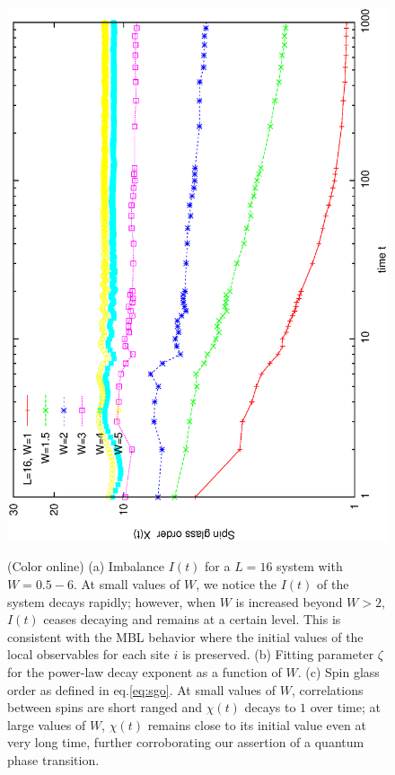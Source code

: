 \documentclass[prl,aps,epsf,showpacs,twocolumn,letterpaper]{revtex4}
\begin{document}
\begin{figure}[h]
	\includegraphics[angle=-90,width=.95\linewidth]{newfig2b.ps}\\
	\caption{
		(Color online) (a) Imbalance $I(t)$ for a $L=16$ system with $W=0.5-6$.  At small values of $W$, we notice the $I(t)$ of the system decays rapidly; however, when $W$ is increased beyond $W>2$, $I(t)$  ceases decaying and remains at a certain level.  This is consistent with the MBL behavior where the initial values of the local observables for each site $i$ is preserved. (b) Fitting parameter $\zeta$ for the power-law decay exponent as a function of $W$. (c) Spin glass order as defined in eq.\ref{eq:sgo}. At small values of $W$, correlations between spins are short ranged and $\chi(t)$ decays to $1$ over time; at large values of $W$, $\chi(t)$ remains close to its initial value even at very long time, further corroborating our assertion of a quantum phase transition.}
	\label{fig4}
\end{figure}
\end{document}
